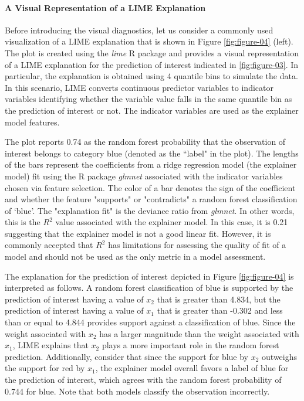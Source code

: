 \documentclass[AMS,STIX2COL]{WileyNJD-v2}\usepackage[]{graphicx}\usepackage[]{color}
\begin{document}
\paragraph{A Visual Representation of a LIME Explanation}

Before introducing the visual diagnostics, let us consider a commonly used visualization of a LIME explanation that is shown in Figure \ref{fig:figure-04} (left). The plot is created using the \emph{lime} R package and provides a visual representation of a LIME explanation for the prediction of interest indicated in \autoref{fig:figure-03}. In particular, the explanation is obtained using 4 quantile bins to simulate the data. In this scenario, LIME converts continuous predictor variables to indicator variables identifying whether the variable value falls in the same quantile bin as the prediction of interest or not. The indicator variables are used as the explainer model features.  

The plot reports 0.74 as  the random forest  probability  that the observation of interest belongs to category blue (denoted as the ``label" in the plot). The lengths of the bars represent the  coefficients from a ridge regression model (the explainer model) fit using the R package \emph{glmnet} \citep{simon:2011} associated with the indicator variables chosen via feature selection. The color of a  bar denotes the sign of the coefficient and whether the feature "supports" or "contradicts" a random forest classification of `blue'. The "explanation fit" is the deviance ratio from  \emph{glmnet}. In other words, this is the $R^2$ value associated with the explainer model. In this case, it is 0.21 suggesting that the explainer model is not a good linear fit. However, it is commonly accepted that $R^2$ has limitations for assessing the quality of fit of a model \citep{sapra:2014} and  should not be used as the only metric in a model assessment.

The explanation for the prediction of interest depicted in Figure \ref{fig:figure-04} is interpreted as follows. A random forest classification of blue is supported by the prediction of interest having a value of $x_2$ that is greater than 4.834, but the prediction of interest having a value of $x_1$ that is greater than -0.302 and less than or equal to 4.844 provides support against a classification of blue. Since the weight associated with $x_2$ has a larger magnitude than the weight associated with $x_1$, LIME explains that $x_2$ plays a more important role in the random forest prediction. Additionally, consider that since the support for blue by $x_2$ outweighs the support for red by $x_1$, the explainer model overall favors a label of blue for the prediction of interest, which agrees with the random forest probability of 0.744 for blue. Note that both models classify the observation incorrectly.
\end{document}
